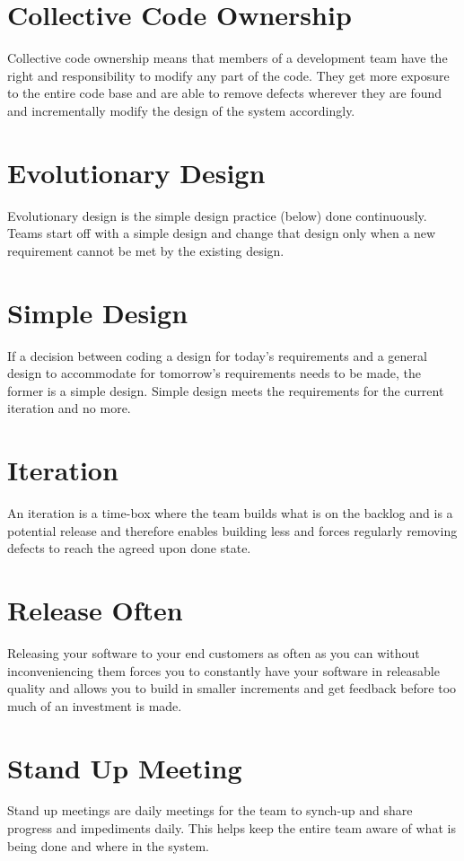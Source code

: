 \section{Collective Code Ownership}
Collective code ownership means that members of a development team have the right and responsibility to modify any part of the code. They get more exposure to the entire code base and are able to remove defects wherever they are found and incrementally modify the design of the system accordingly.

\section{Evolutionary Design}
Evolutionary design is the simple design practice (below) done continuously. Teams start off with a simple design and change that design only when a new requirement cannot be met by the existing design.

\section{Simple Design}
If a decision between coding a design for today’s requirements and a general design to accommodate for tomorrow’s requirements needs to be made, the former is a simple design. Simple design meets the requirements for the current iteration and no more.

\section{Iteration}
An iteration is a time-box where the team builds what is on the backlog and is a potential release and therefore enables building less and forces regularly removing defects to reach the agreed upon done state.

\section{Release Often}
Releasing your software to your end customers as often as you can without inconveniencing them forces you to constantly have your software in releasable quality and allows you to build in smaller increments and get feedback before too much of an investment is made.

\section{Stand Up Meeting}
Stand up meetings are daily meetings for the team to synch-up and share progress and impediments daily. This helps keep the entire team aware of what is being done and where in the system.